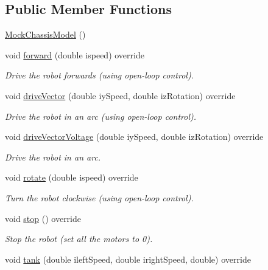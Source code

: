 \subsection*{Public Member Functions}
\begin{DoxyCompactItemize}
\item 
\mbox{\hyperlink{classokapi_1_1MockChassisModel_a283b98e211e6b959a5b256af36bb7fbf}{Mock\+Chassis\+Model}} ()
\item 
void \mbox{\hyperlink{classokapi_1_1MockChassisModel_abfc507d3172ba7b6e5d55bcf547fb07f}{forward}} (double ispeed) override
\begin{DoxyCompactList}\small\item\em Drive the robot forwards (using open-\/loop control). \end{DoxyCompactList}\item 
void \mbox{\hyperlink{classokapi_1_1MockChassisModel_aeec6a0c1cc738f057bb8e34a1a1bb3b1}{drive\+Vector}} (double iy\+Speed, double iz\+Rotation) override
\begin{DoxyCompactList}\small\item\em Drive the robot in an arc (using open-\/loop control). \end{DoxyCompactList}\item 
void \mbox{\hyperlink{classokapi_1_1MockChassisModel_a8b788327fc3d4eab2be323e9b1ddf854}{drive\+Vector\+Voltage}} (double iy\+Speed, double iz\+Rotation) override
\begin{DoxyCompactList}\small\item\em Drive the robot in an arc. \end{DoxyCompactList}\item 
void \mbox{\hyperlink{classokapi_1_1MockChassisModel_afae0eded3e67bd83b4531c0c92f4d300}{rotate}} (double ispeed) override
\begin{DoxyCompactList}\small\item\em Turn the robot clockwise (using open-\/loop control). \end{DoxyCompactList}\item 
void \mbox{\hyperlink{classokapi_1_1MockChassisModel_accf69b869ef39764bd3dc76170abbd2f}{stop}} () override
\begin{DoxyCompactList}\small\item\em Stop the robot (set all the motors to 0). \end{DoxyCompactList}\item 
void \mbox{\hyperlink{classokapi_1_1MockChassisModel_a5e2cb9040c25e5fcbb034c54d45d418e}{tank}} (double ileft\+Speed, double iright\+Speed, double) override

\end{DoxyCompactItemize}
